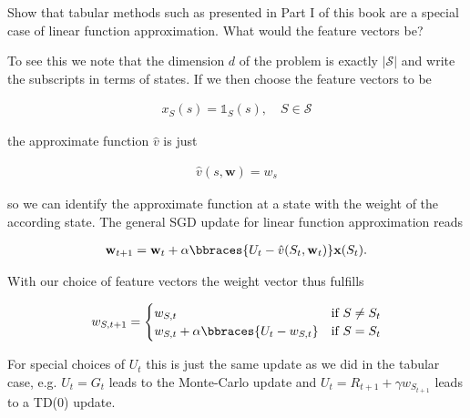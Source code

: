 
\begin{exercise}

Show that tabular methods such as presented in Part I of this book are a special case of linear function approximation.
What would the feature vectors be?

\end{exercise}


\begin{solution}

To see this we note that the dimension $d$ of the problem is exactly $|\mathcal{S}|$ and write the subscripts in terms of states. If we then choose the feature vectors to be

\begin{align*}
  x_{S}(s) =
  \mathds{1}_{S}(s), \quad S \in \mathcal{S}
\end{align*}

the approximate function $\hat{v}$ is just

\begin{align*}
  \hat{v}(s,\textbf{w})
  =
  w_s
\end{align*}

 so we can identify the approximate function at a state with the weight of the according state. The general SGD update for linear function approximation reads

\begin{align*}
  \textbf{w}_{t+1}
  =
  \textbf{w}_t + \alpha \bbraces{U_t - \hat{v}(S_t,\textbf{w}_t)}\textbf{x}(S_t).
\end{align*}

With our choice of feature vectors the weight vector thus fulfills

\begin{align*}
  w_{S,t+1}
  =
  \begin{cases}
    w_{S,t} & \text{if } S \neq S_t \\
    w_{S,t} + \alpha\bbraces{U_t - w_{S,t}} & \text{if } S = S_t
  \end{cases}
\end{align*}

For special choices of $U_t$ this is just the same update as we did in the tabular case, e.g. $U_t = G_t$ leads to the Monte-Carlo update and $U_t = R_{t+1} + \gamma w_{S_{t+1}}$ leads to a TD(0) update.
\end{solution}


